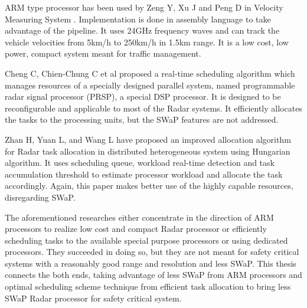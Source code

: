 ARM type processor has been used by Zeng Y, Xu J and Peng D in Velocity Measuring System \cite{relWork2}. Implementation is done in assembly language to take advantage of the pipeline. It uses 24GHz frequency waves and can track the vehicle velocities from 5km/h to 250km/h in 1.5km range. It is a low cost, low power, compact system meant for traffic management.

Cheng C, Chien-Chung C et al \cite{RTsched} proposed a real-time scheduling algorithm which manages resources of a specially designed parallel system, named programmable radar signal processor (PRSP), a special DSP processor. It is designed to be reconfigurable and applicable to most of the Radar systems. It efficiently allocates the tasks to the processing units, but the SWaP features are not addressed.

Zhan H, Yuan L, and Wang L \cite{RTschedParallel} have proposed an improved allocation algorithm for Radar task allocation in distributed heterogeneous system using Hungarian algorithm. It uses scheduling queue, workload real-time detection and task accumulation threshold to estimate processor workload and allocate the task accordingly. Again, this paper makes better use of the highly capable resources, disregarding SWaP.

The aforementioned researches either concentrate in the direction of ARM processors to realize low cost and compact Radar processor or efficiently scheduling tasks to the available special purpose processors or using dedicated processors. They succeeded in doing so, but they are not meant for safety critical systems with a reasonably good range and resolution and less SWaP. This thesis connects the both ends, taking advantage of less SWaP from ARM processors and optimal scheduling scheme technique from efficient task allocation to bring less SWaP Radar processor for safety critical system.

